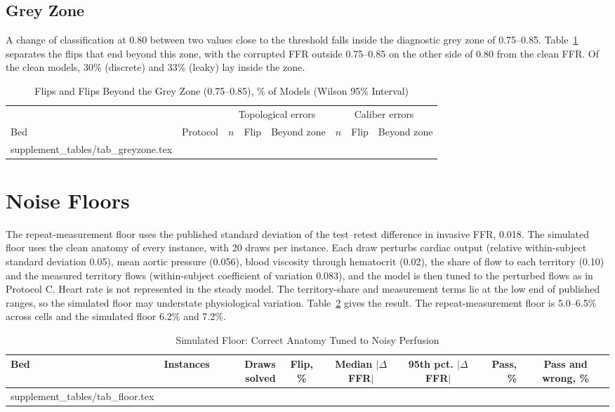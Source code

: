 \documentclass[journal,twoside,web,onecolumn]{ieeecolor}
\begin{document}
\subsection{Grey Zone}\label{sec:grey}
A change of classification at 0.80 between two values close to the threshold falls inside the diagnostic grey zone
of 0.75--0.85. Table~\ref{tab:grey} separates the flips that end beyond this zone, with the corrupted FFR outside
0.75--0.85 on the other side of 0.80 from the clean FFR. Of the clean models, 30\% (discrete) and 33\% (leaky) lay
inside the zone.
\begin{table}[!ht]
\caption{Flips and Flips Beyond the Grey Zone (0.75--0.85), \% of Models (Wilson 95\% Interval)}\label{tab:grey}
\centering\footnotesize
\begin{tabular}{@{}llrccrcc@{}}
\toprule
 & & \multicolumn{3}{c}{Topological errors} & \multicolumn{3}{c}{Caliber errors}\\
\cmidrule(lr){3-5}\cmidrule(l){6-8}
Bed & Protocol & $n$ & Flip & Beyond zone & $n$ & Flip & Beyond zone\\
\midrule
{} supplement_tables/tab_greyzone.tex 
\bottomrule
\end{tabular}
\end{table}

\FloatBarrier
\section{Noise Floors}\label{sec:floor}
The repeat-measurement floor uses the published standard deviation of the test--retest difference in invasive FFR, 0.018. The simulated floor
uses the clean anatomy of every instance, with 20 draws per instance. Each draw perturbs cardiac output (relative
within-subject standard deviation 0.05), mean aortic pressure (0.056), blood viscosity through hematocrit (0.02), the
share of flow to each territory (0.10) and the measured territory flows (within-subject coefficient of variation
0.083), and the model is then tuned to the perturbed flows as in Protocol C. Heart rate is not represented in the
steady model. The territory-share and measurement terms lie at the low end of published ranges, so the simulated floor
may understate physiological variation. Table~\ref{tab:floor} gives the result. The repeat-measurement floor is
5.0--6.5\% across cells and the simulated floor 6.2\% and 7.2\%.
\begin{table}[!ht]
\caption{Simulated Floor: Correct Anatomy Tuned to Noisy Perfusion}\label{tab:floor}
\centering\small
\begin{tabular}{@{}lrrcccrc@{}}
\toprule
Bed & Instances & Draws solved & Flip, \% & Median $|\Delta$FFR$|$ & 95th pct. $|\Delta$FFR$|$ & Pass, \% &
Pass and wrong, \%\\
\midrule
{} supplement_tables/tab_floor.tex 
\bottomrule
\end{tabular}
\end{table}
\end{document}
